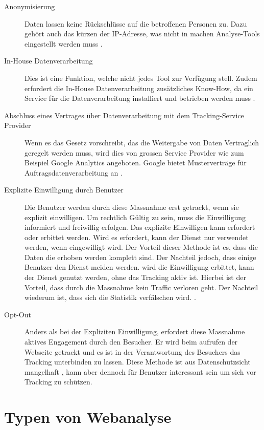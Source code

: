 \begin{description}
  \item[Anonymisierung] Daten lassen keine Rückschlüsse auf die betroffenen Personen zu. Dazu gehört auch das kürzen der IP-Adresse, was nicht in machen Analyse-Tools eingestellt werden muss \parencite[S. 3]{EcommerceUndDatenschutz}.
  \item[In-House Datenverarbeitung] Dies ist eine Funktion, welche nicht jedes Tool zur Verfügung stell. Zudem erfordert die In-House Datenverarbeitung zusätzliches Know-How, da ein Service für die Datenverarbeitung installiert und betrieben werden muss \parencite[S. 175]{nakatani2011toolselectionmethod}. 
  \item[Abschluss eines Vertrages über Datenverarbeitung mit dem Tracking-Service Provider] Wenn es das Gesetz vorschreibt, das die Weitergabe von Daten Vertraglich geregelt werden muss, wird dies von grossen Service Provider wie zum Beispiel Google Analytics angeboten. Google bietet Musterverträge für Auftragsdatenverarbeitung an \parencite[S. 5]{EcommerceUndDatenschutz}. 
  \item[Explizite Einwilligung durch Benutzer] Die Benutzer werden durch diese Massnahme erst getrackt, wenn sie explizit einwilligen. Um rechtlich Gültig zu sein, muss die Einwilligung informiert und freiwillig erfolgen. Das explizite Einwilligen kann erfordert oder erbittet werden. Wird es erfordert, kann der Dienst nur verwendet werden, wenn eingewilligt wird. Der Vorteil dieser Methode ist es, dass die Daten die erhoben werden komplett sind. Der Nachteil jedoch, dass einige Benutzer den Dienst meiden werden. wird die Einwilligung erbittet, kann der Dienst genutzt werden, ohne das Tracking aktiv ist. Hierbei ist der Vorteil, dass durch die Massnahme kein Traffic verloren geht. Der Nachteil wiederum ist, dass sich die Statistik verfälschen wird. \parencite[S. 2-3]{EcommerceUndDatenschutz}.
  \item[Opt-Out] Anders als bei der Expliziten Einwilligung, erfordert diese Massnahme aktives Engagement durch den Besucher. Er wird beim aufrufen der Webseite getrackt und es ist in der Verantwortung des Besuchers das Tracking unterbinden zu lassen. Diese Methode ist aus Datenschutzsicht mangelhaft \parencite[§§ 9 Abs. 4]{DSSGBERN}, kann aber dennoch für Benutzer interessant sein um sich vor Tracking zu schützen.
\end{description}


\section{Typen von Webanalyse}

